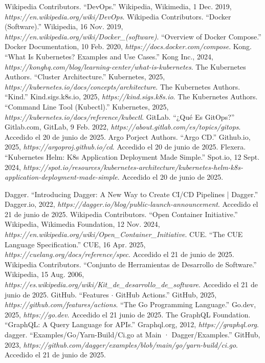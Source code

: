 \begin{thebibliography}{99}
 Wikipedia Contributors. ``DevOps.'' Wikipedia, Wikimedia, 1 Dec. 2019, {\it https://en.wikipedia.org/wiki/DevOps}.
 Wikipedia Contributors. ``Docker (Software).'' Wikipedia, 16 Nov. 2019, {\it https://en.wikipedia.org/wiki/Docker\_(software)}.
 ``Overview of Docker Compose.'' Docker Documentation, 10 Feb. 2020, {\it https://docs.docker.com/compose}.
 Kong. ``What Is Kubernetes? Examples and Use Cases.'' Kong Inc., 2024, {\it https://konghq.com/blog/learning-center/what-is-kubernetes}.
 The Kubernetes Authors. ``Cluster Architecture.'' Kubernetes, 2025, {\it https://kubernetes.io/docs/concepts/architecture}.
 The Kubernetes Authors. ``Kind.'' Kind.sigs.k8s.io, 2025, {\it https://kind.sigs.k8s.io}.
 The Kubernetes Authors. ``Command Line Tool (Kubectl).'' Kubernetes, 2025, {\it https://kubernetes.io/docs/reference/kubectl}.
 GitLab. ``¿Qué Es GitOps?'' Gitlab.com, GitLab, 9 Feb. 2022, {\it https://about.gitlab.com/es/topics/gitops}. Accedido el 20 de junio de 2025.
 Argo Porject Authors. ``Argo CD.'' Github.io, 2025, {\it https://argoproj.github.io/cd}. Accedido el 20 de junio de 2025.
 Flexera. ``Kubernetes Helm: K8s Application Deployment Made Simple.'' Spot.io, 12 Sept. 2024, {\it https://spot.io/resources/kubernetes-architecture/kubernetes-helm-k8s-application-deployment-made-simple}. Accedido el 20 de junio de 2025.

 Dagger. ``Introducing Dagger: A New Way to Create CI/CD Pipelines | Dagger.'' Dagger.io, 2022, {\it https://dagger.io/blog/public-launch-announcement}. Accedido el 21 de junio de 2025.
 Wikipedia Contributors. ``Open Container Initiative.'' Wikipedia, Wikimedia Foundation, 12 Nov. 2024, {\it https://en.wikipedia.org/wiki/Open\_Container\_Initiative}.
 CUE. ``The CUE Language Specification.'' CUE, 16 Apr. 2025, {\it https://cuelang.org/docs/reference/spec}. Accedido el 21 de junio de 2025.
 Wikipedia Contributors. ``Conjunto de Herramientas de Desarrollo de Software.'' Wikipedia, 15 Aug. 2006, {\it https://es.wikipedia.org/wiki/Kit\_de\_desarrollo\_de\_software}. Accedido el 21 de junio de 2025.
 GitHub. ``Features $\cdot$ GitHub Actions.'' GitHub, 2025, {\it https://github.com/features/actions}.
 ``The Go Programming Language.'' Go.dev, 2025, {\it https://go.dev}. Accedido el 21 junio de 2025.
 The GraphQL Foundation. ``GraphQL: A Query Language for APIs.'' Graphql.org, 2012, {\it https://graphql.org}.
 dagger. ``Examples/Go/Yarn-Build/Ci.go at Main · Dagger/Examples.'' GitHub, 2023, {\it https://github.com/dagger/examples/blob/main/go/yarn-build/ci.go}. Accedido el 21 de junio de 2025.


\end{thebibliography}
